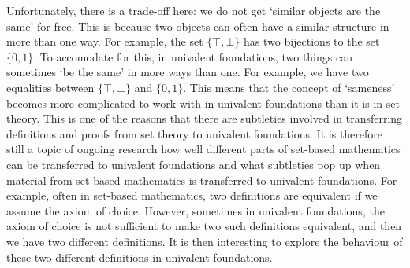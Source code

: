 Unfortunately, there is a trade-off here: we do not get `similar objects are the same' for free. This is because two objects can often have a similar structure in more than one way. For example, the set $ \{ \top, \bot \} $ has two bijections to the set $ \{ 0, 1 \} $. To accomodate for this, in univalent foundations, two things can sometimes `be the same' in more ways than one. For example, we have two equalities between $ \{ \top, \bot \} $ and $ \{ 0, 1 \} $. This means that the concept of `sameness' becomes more complicated to work with in univalent foundations than it is in set theory. This is one of the reasons that there are subtleties involved in transferring definitions and proofs from set theory to univalent foundations. It is therefore still a topic of ongoing research how well different parts of set-based mathematics can be transferred to univalent foundations and what subtleties pop up when material from set-based mathematics is transferred to univalent foundations. For example, often in set-based mathematics, two definitions are equivalent if we assume the axiom of choice. However, sometimes in univalent foundations, the axiom of choice is not sufficient to make two such definitions equivalent, and then we have two different definitions. It is then interesting to explore the behaviour of these two different definitions in univalent foundations.


